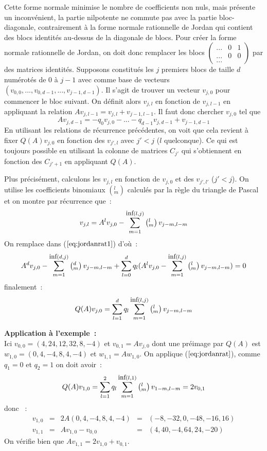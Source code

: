 \documentclass[a4paper,11pt]{article}
\begin{document}
\begin{giacjshere}
Cette forme normale minimise le nombre de coefficients non nuls,
mais présente un inconvénient, la partie nilpotente ne commute pas
avec la partie bloc-diagonale, contrairement à la forme normale
rationnelle de Jordan qui contient des blocs identités au-dessus
de la diagonale de blocs.
Pour créer la forme normale rationnelle de Jordan, on doit donc remplacer
les blocs $\left( \begin{array}{ccc} ... & 0 & 1 \\ ... & 0 & 0 
\\ ... \end{array} \right)$
par des matrices identit\'es. Supposons constitués les $j$ premiers blocs de
taille $d$ numérotés de 0 à $j-1$ avec comme base de vecteurs
$(v_{0,0},...,v_{0,d-1},...,v_{j-1,d-1})$. 
Il s'agit de trouver un vecteur $v_{j,0}$ pour commencer le bloc
suivant. On définit alors $v_{j,l}$ en fonction de $v_{j,l-1}$
en appliquant la relation $Av_{j,l-1}=v_{j,l}+v_{j-1,l-1}$.
Il faut donc chercher $v_{j,0}$ tel que 
\begin{equation} \label{eq:jordanrat1}
 Av_{j,d-1}=-q_0 v_{j,0}-...-q_{d-1} v_{j,d-1}+v_{j-1,d-1} 
\end{equation}
En utilisant les relations de récurrence précédentes, on voit que
cela revient à fixer $Q(A)v_{j,0}$ en fonction des $v_{j',l}$ avec
$j'<j$ ($l$ quelconque). Ce qui est toujours possible en utilisant
la colonne de matrices $C_{j'}$ qui s'obtiennent en
fonction des $C_{j'+1}$ en appliquant $Q(A)$.

Plus pr\'ecis\'ement, calculons les $v_{j,l}$ en fonction de $v_{j,0}$
et des $v_{j',l'}$ ($j'<j$). On utilise les coefficients binomiaux 
$\left( ^l_m\right)$ calcul\'es par la r\`egle du triangle de Pascal et
on montre par r\'ecurrence que~:
\begin{equation} \label{eq:jordanrat3}
v_{j,l} = A^l v_{j,0} - \sum_{m=1}^{\mbox{\small inf}(l,j)} 
\left( ^l _m\right) v_{j-m,l-m}
\end{equation}
On remplace dans (\(\ref{eq:jordanrat1}\)) d'o\`u~:
\[ A^d v_{j,0} - \sum_{m=1}^{\mbox{\small inf}(d,j)} 
\left( ^d _m\right)v_{j-m,l-m}
+ \sum_{l=0}^d 
q_l (A^l v_{j,0} - \sum_{m=1}^{\mbox{\small inf}(l,j)} \left( ^l _m\right) 
v_{j-m,l-m} )=0
\]
finalement~:
\begin{equation} \label{eq:jordanrat}
 Q(A) v_{j,0}= \sum_{l=1}^d 
q_l \sum_{m=1}^{\mbox{\small inf}(l,j)} \left( ^l _m\right) v_{j-m,l-m} 
\end{equation}

{\bf Application \`a l'exemple~:}\\
Ici $v_{0,0}=(4,24,12,32,8,-4)$ et $v_{0,1}=Av_{j,0}$ dont une pr\'eimage
par $Q(A)$ est $w_{1,0}=(0,4,-4,8,4,-4)$ et $w_{1,1}=Aw_{1,0}$.
On applique (\(\ref{eq:jordanrat}\)), comme $q_1=0$ et $q_2=1$
on doit avoir~:
\[ Q(A) v_{1,0} = \sum_{l=1}^2
q_l \sum_{m=1}^{\mbox{\small inf}(l,1)} \left( ^l _m\right) v_{1-m,l-m} 
 =2v_{0,1} \]
donc ~:
\[\begin{array}{ccccc}
 v_{1,0}&=&2A(0,4,-4,8,4,-4)&=&(-8,-32,0,-48,-16,16) \\
 v_{1,1}&=&Av_{1,0}-v_{0,0}&=&(4,40,-4,64,24,-20) 
\end{array}
\]
On v\'erifie bien que $Av_{1,1}=2v_{1,0}+v_{0,1}$.


\end{giacjshere}
\end{document}
